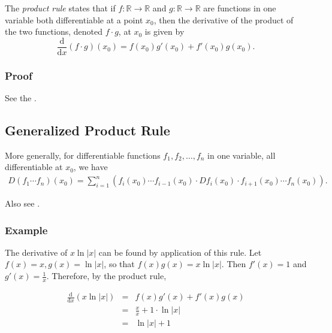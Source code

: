 \documentclass[12pt]{article}
\newcommand{\D}[1]{\ensuremath{\mathrm{d}#1}}
\begin{document}
The \emph{product rule} states that if $f:\mathbb{R}\rightarrow\mathbb{R}$ and $g:\mathbb{R}\rightarrow\mathbb{R}$ are functions in one variable both differentiable at a point $x_0$, then the derivative of the product of the two functions, denoted $f\cdot g$, at $x_0$ is given by
\begin{equation*}
\frac{\D{}}{\D{x}}\left(f\cdot g\right)(x_0) = f(x_0)g'(x_0) + f'(x_0)g(x_0).
\end{equation*}

\subsubsection*{Proof}
See the .
\subsection{Generalized Product Rule}
More generally, for differentiable functions $f_1, f_2,\ldots,f_n$ in one variable, all differentiable at $x_0$, we have
\begin{align*}
D(f_1\cdots f_n)(x_0)=\sum_{i=1}^n\left(f_i(x_0)\cdots f_{i-1}(x_0)\cdot Df_i(x_0)\cdot f_{i+1}(x_0)\cdots f_n(x_0)\right).
\end{align*}

Also see .

\subsubsection*{Example}

The derivative of $x\ln|x|$ can be found by application of this rule.
Let $f(x) = x, g(x) = \ln|x|$, so that $f(x)g(x) = x\ln|x|$.  Then $f'(x) = 1$ and
$g'(x) = \frac{1}{x}$.  Therefore, by the product rule,

\begin{eqnarray*}
\frac{\D{}}{\D{x}}(x\ln|x|) & = & f(x)g'(x) + f'(x)g(x) \\
& = & \frac{x}{x} + 1\cdot\ln|x| \\
& = & \ln|x| + 1
\end{eqnarray*}
\end{document}
